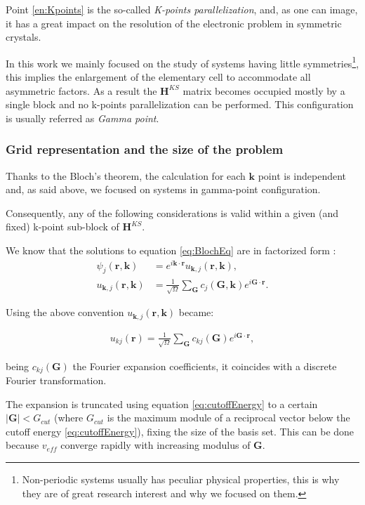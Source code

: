 \documentclass[a4paper,12pt]{article}
\newcommand\mf[1]{\mathbf{#1}}
\newcommand\erre{\mathbf{r}}
\newcommand\GI{\mathbf{G}}
\begin{document}
Point \ref{en:Kpoints} is the so-called \textit{K-points parallelization}, and, as one can image, it has a great impact on the resolution of the electronic problem in symmetric crystals.

In this work we mainly focused on the study of systems having little symmetries\footnote{Non-periodic systems usually has peculiar physical properties, this is why they are of great research interest and why we focused on them.}, this implies the enlargement of the elementary cell to accommodate all asymmetric factors. 
As a result the $\mf{H}^{KS}$ matrix becomes occupied mostly by a single block and no k-points parallelization can be performed.
This configuration is usually referred as \textit{Gamma point}.



\subsubsection{Grid representation and the size of the problem} \label{sec:Grid}

Thanks to the Bloch's theorem, the calculation for each $\mf{k}$ point is independent and, as said above, we focused on systems in gamma-point configuration. 

Consequently, any of the following considerations is valid within a given (and fixed) k-point sub-block of $\mf{H}^{KS}$.

We know that the solutions to equation \eqref{eq:BlochEq} are in factorized form :
\begin{align}
	\psi_{j}(\erre,\mf{k}) &= e^{i \mf{k} \cdot	 \erre} u_{\mf{k},j}(\erre,\mf{k}), \\
	u_{\mf{k},j}(\erre,\mf{k}) &= \frac{1}{\sqrt{\Omega}} \sum_{\GI} c_{j}(\GI,\mf{k})e^{i \GI \cdot \erre}.
\end{align}

Using the above convention $u_{\mf{k},j}(\erre,\mf{k})$ became:

\begin{align}
	u_{kj}(\erre) = \frac{1}{\sqrt{\Omega}} \sum_{\GI} c_{kj}(\GI)e^{i \GI \cdot \erre},
\end{align}

being $c_{kj}(\GI)$ the Fourier expansion coefficients, it coincides with a discrete Fourier transformation.

The expansion is truncated using equation \eqref{eq:cutoffEnergy} to a certain $\mid \GI \mid < G_{cut}$ (where $G_{cut}$ is the maximum module of a reciprocal vector below the cutoff energy \eqref{eq:cutoffEnergy}), fixing the size of the basis set. This can be done because $v_{eff}$ converge rapidly with increasing modulus of $\GI$.
\end{document}
